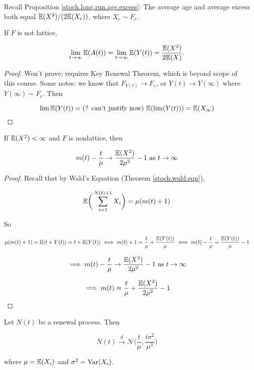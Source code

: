 Recall Proposition \ref{stoch.long.run.age.excess}: The average age and average excess both equal \(\E(X^2)/(2 \E(X_e))\), where \(X_e \sim F_e\).

\begin{theorem} If \(F\) is not lattice,

\[
\lim_{t \to \infty} \E(A(t)) = \lim_{t \to \infty} \E(Y(t)) = \frac{ \E(X^2)}{2 \E(X)}.
\]

\end{theorem}

\begin{proof}Won't prove; requires Key Renewal Theorem, which is beyond scope of this course. Some notes: we know that \(F_{Y(t)} \to F_e\), or \(Y(t) \to Y(\infty)\) where \(Y(\infty) \sim F_e\). Then

\[
\lim \E(Y(t)) = \text{(? can't justify now) } \E(\lim (Y(t))) = \E(X_\infty)
\]

\end{proof}

\begin{corollary}

If \(\E(X^2) < \infty\) and \(F\) is nonlattice, then

\[
 m(t) - \frac{t}{\mu} \to \frac{\E(X^2)}{2 \mu^2} - 1 \text{ as } t \to \infty
\]


\end{corollary}

\begin{proof}

Recall that by Wald's Equation (Theorem \ref{stoch.wald.eqn}),

\[
\E \bigg( \sum_{i=1}^{N(t) + 1} X_i \bigg) = \mu (m(t) + 1)
\]

So

\[
\mu(m(t) + 1) = \E(t + Y(t)) = t + \E(Y(t)) \iff  m(t) + 1 =  \frac{t}{\mu} + \frac{\E(Y(t)) }{\mu} \iff m(t) - \frac{t}{\mu} = \frac{\E(Y(t))}{\mu} - 1
\]

\[
\implies m(t) - \frac{t}{\mu} \to \frac{\E(X^2)}{2 \mu^2} - 1 \text{ as } t \to \infty
\]

\[
\implies m(t) \approx \frac{t}{\mu} +  \frac{\E(X^2)}{2 \mu^2} - 1 
\]

\end{proof}

\begin{theorem}

Let \(N(t)\) be a renewal process. Then

\[
N(t) \xrightarrow{d} \mathcal{N} \bigg( \frac{t}{\mu}, \frac{t \sigma^2}{\mu^3} \bigg)
\]

where \(\mu = \E(X_i)\) and \(\sigma^2 = \Var(X_i)\).

\end{theorem}

